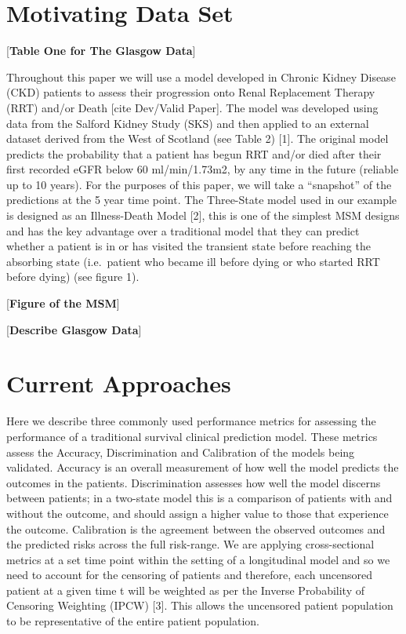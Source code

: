 \documentclass[12pt,PhD,twoside,openright]{muthesis}
\begin{document}
\hypertarget{motivating-data-set}{%
\section{Motivating Data Set}\label{motivating-data-set}}

{[}\textbf{Table One for The Glasgow Data}{]}

Throughout this paper we will use a model developed in Chronic Kidney Disease (CKD) patients to assess their progression onto Renal Replacement Therapy (RRT) and/or Death {[}cite Dev/Valid Paper{]}. The model was developed using data from the Salford Kidney Study (SKS) and then applied to an external dataset derived from the West of Scotland (see Table 2) {[}1{]}. The original model predicts the probability that a patient has begun RRT and/or died after their first recorded eGFR below 60 ml/min/1.73m2, by any time in the future (reliable up to 10 years). For the purposes of this paper, we will take a ``snapshot'' of the predictions at the 5 year time point.
The Three-State model used in our example is designed as an Illness-Death Model {[}2{]}, this is one of the simplest MSM designs and has the key advantage over a traditional model that they can predict whether a patient is in or has visited the transient state before reaching the absorbing state (i.e.~patient who became ill before dying or who started RRT before dying) (see figure 1).

{[}\textbf{Figure of the MSM}{]}

{[}\textbf{Describe Glasgow Data}{]}

\hypertarget{current-approaches}{%
\section{Current Approaches}\label{current-approaches}}

Here we describe three commonly used performance metrics for assessing the performance of a traditional survival clinical prediction model. These metrics assess the Accuracy, Discrimination and Calibration of the models being validated. Accuracy is an overall measurement of how well the model predicts the outcomes in the patients. Discrimination assesses how well the model discerns between patients; in a two-state model this is a comparison of patients with and without the outcome, and should assign a higher value to those that experience the outcome. Calibration is the agreement between the observed outcomes and the predicted risks across the full risk-range.
We are applying cross-sectional metrics at a set time point within the setting of a longitudinal model and so we need to account for the censoring of patients and therefore, each uncensored patient at a given time t will be weighted as per the Inverse Probability of Censoring Weighting (IPCW) {[}3{]}. This allows the uncensored patient population to be representative of the entire patient population.
\end{document}
